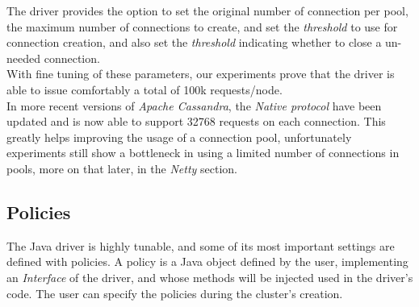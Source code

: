\documentclass[a4paper]{report}
\newcommand{\ca}{\emph{Apache Cassandra\xspace}}
\begin{document}
The driver provides the option to set the original number of connection per pool, the maximum number of connections to create, and set the \emph{threshold} to use for connection creation, and also set the \emph{threshold} indicating whether to close a un-needed connection.\\
With fine tuning of these parameters, our experiments prove that the driver is able to issue comfortably a total of 100k requests/node.\\
In more recent versions of \ca{}, the \emph{Native protocol} have been updated and is now able to support 32768 requests on each connection. This greatly helps improving the usage of a connection pool, unfortunately experiments still show a bottleneck in using a limited number of connections in pools, more on that later, in the \emph{Netty} section.

\subsection{Policies}
The Java driver is highly tunable, and some of its most important settings are defined with policies. A policy is a Java object defined by the user, implementing an \emph{Interface} of the driver, and whose methods will be injected used in the driver's code. The user can specify the policies during the cluster's creation.
\end{document}
